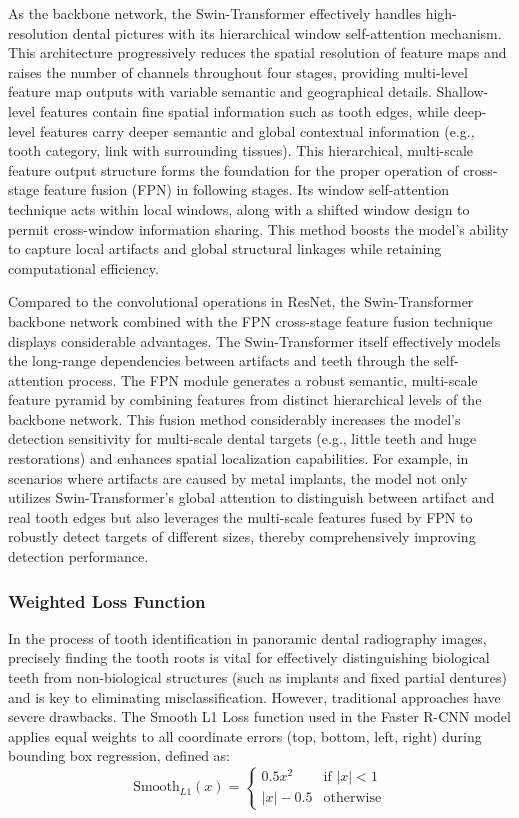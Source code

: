\documentclass[pdflatex,sn-mathphys-num]{sn-jnl}%
\theoremstyle{thmstyleone}%
\theoremstyle{thmstyletwo}%
\theoremstyle{thmstylethree}%
\begin{document}
 As the backbone network, the Swin-Transformer effectively handles high-resolution dental pictures with its hierarchical window self-attention mechanism.  This architecture progressively reduces the spatial resolution of feature maps and raises the number of channels throughout four stages, providing multi-level feature map outputs with variable semantic and geographical details.  Shallow-level features contain fine spatial information such as tooth edges, while deep-level features carry deeper semantic and global contextual information (e.g., tooth category, link with surrounding tissues).  This hierarchical, multi-scale feature output structure forms the foundation for the proper operation of cross-stage feature fusion (FPN) in following stages.  Its window self-attention technique acts within local windows, along with a shifted window design to permit cross-window information sharing.  This method boosts the model's ability to capture local artifacts and global structural linkages while retaining computational efficiency.

 Compared to the convolutional operations in ResNet, the Swin-Transformer backbone network combined with the FPN cross-stage feature fusion technique displays considerable advantages.  The Swin-Transformer itself effectively models the long-range dependencies between artifacts and teeth through the self-attention process.  The FPN module generates a robust semantic, multi-scale feature pyramid by combining features from distinct hierarchical levels of the backbone network.  This fusion method considerably increases the model's detection sensitivity for multi-scale dental targets (e.g., little teeth and huge restorations) and enhances spatial localization capabilities.  For example, in scenarios where artifacts are caused by metal implants, the model not only utilizes Swin-Transformer's global attention to distinguish between artifact and real tooth edges but also leverages the multi-scale features fused by FPN to robustly detect targets of different sizes, thereby comprehensively improving detection performance.

\subsubsection{Weighted Loss Function}

In the process of tooth identification in panoramic dental radiography images, precisely finding the tooth roots is vital for effectively distinguishing biological teeth from non-biological structures (such as implants and fixed partial dentures) and is key to eliminating misclassification.  However, traditional approaches have severe drawbacks.  The Smooth L1 Loss function used in the Faster R-CNN model applies equal weights to all coordinate errors (top, bottom, left, right) during bounding box regression, defined as:
\[
\text{Smooth}_{L1}(x) = 
\begin{cases}
0.5x^2 & \text{if } |x| < 1 \\
|x| - 0.5 & \text{otherwise}
\end{cases}
\]
\end{document}
